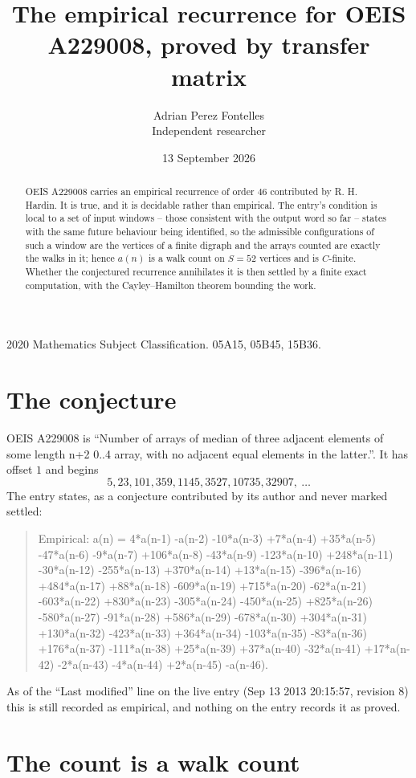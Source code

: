 \documentclass[11pt,a4paper]{article}
\title{The empirical recurrence for OEIS A229008, proved by transfer matrix}
\author{Adrian Perez Fontelles\\ \small Independent researcher}
\date{13 September 2026}
\theoremstyle{plain}
\theoremstyle{definition}
\begin{document}
\maketitle

\begin{abstract}
OEIS A229008 carries an empirical recurrence of order $46$ contributed by R. H. Hardin. It is
true, and it is decidable rather than empirical. The entry's condition is local to a set of input windows -- those consistent with the output word so far -- states with the same future behaviour being identified, so
the admissible configurations of such a window are the vertices of a finite digraph and the
arrays counted are exactly the walks in it; hence $a(n)$ is a walk count on $S=52$ vertices
and is $C$-finite. Whether the conjectured recurrence annihilates it is then settled by a
finite exact computation, with the Cayley--Hamilton theorem bounding the work.
\end{abstract}

\noindent\small 2020 Mathematics Subject Classification. 05A15, 05B45, 15B36.\normalsize

\section{The conjecture}

OEIS A229008 is ``Number of arrays of median of three adjacent elements of some length n+2 0..4 array, with no adjacent equal elements in the latter.''. It has offset $1$ and begins
\[
5, 23, 101, 359, 1145, 3527, 10735, 32907,\ \dots
\]
The entry states, as a conjecture contributed by its author and never marked settled:
\begin{quote}
Empirical: a(n) = 4*a(n-1) -a(n-2) -10*a(n-3) +7*a(n-4) +35*a(n-5) -47*a(n-6) -9*a(n-7) +106*a(n-8) -43*a(n-9) -123*a(n-10) +248*a(n-11) -30*a(n-12) -255*a(n-13) +370*a(n-14) +13*a(n-15) -396*a(n-16) +484*a(n-17) +88*a(n-18) -609*a(n-19) +715*a(n-20) -62*a(n-21) -603*a(n-22) +830*a(n-23) -305*a(n-24) -450*a(n-25) +825*a(n-26) -580*a(n-27) -91*a(n-28) +586*a(n-29) -678*a(n-30) +304*a(n-31) +130*a(n-32) -423*a(n-33) +364*a(n-34) -103*a(n-35) -83*a(n-36) +176*a(n-37) -111*a(n-38) +25*a(n-39) +37*a(n-40) -32*a(n-41) +17*a(n-42) -2*a(n-43) -4*a(n-44) +2*a(n-45) -a(n-46).
\end{quote}
As of the ``Last modified'' line on the live entry (Sep 13 2013 20:15:57, revision 8) this is still
recorded as empirical, and nothing on the entry records it as proved.

\section{The count is a walk count}
\end{document}
